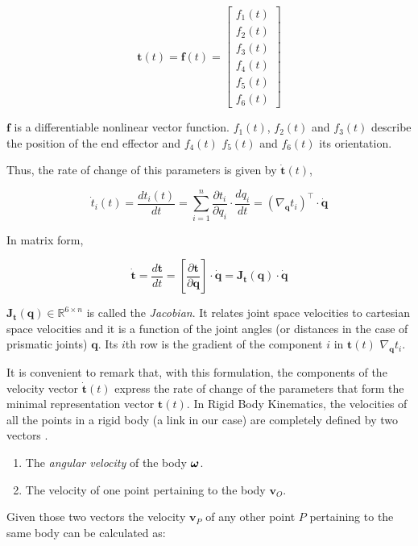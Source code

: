 $$\mathbf{t}(t) = \mathbf{f}(t) = \begin{bmatrix} f_{1}(t) \\ f_{2}(t) \\ f_{3}(t) \\ f_{4}(t) \\ f_{5}(t) \\ f_{6}(t) \end{bmatrix}
$$

$\mathbf{f}$ is a differentiable nonlinear vector function. $f_{1}(t)$, $f_{2}(t)$ and $f_{3}(t)$ describe the position of the end effector and $f_{4}(t)$ $f_{5}(t)$ and $f_{6}(t)$ its orientation.

Thus, the rate of change of this parameters is given by $\mathbf{\dot{t}}(t)$,

$$
\label{asdf}
{\dot{t}_i}(t) = \frac{d{{t}_i}(t)}{dt} = \sum_{i=1}^{n} \frac{\partial{{t}_i}}{\partial q_i} \cdot \frac{dq_i}{dt} = (\nabla_{\mathbf{q}}{t}_i)^{\intercal} \cdot \mathbf{\dot{q}}
$$

In matrix form,

$$
\mathbf{\dot{t}} = \frac{d\mathbf{{t}}}{dt} =
[
    \frac{\partial{\mathbf{t}}}{\partial \mathbf{q}}
]
\cdot \mathbf{\dot{q}} =
\mathbf{J}_{\mathbf{t}}(\mathbf{{q}}) \cdot \mathbf{\dot{q}}
$$

$\mathbf{J}_{\mathbf{t}}(\mathbf{{q}}) \in \mathbb{R}^{6 \times n}$ is called the \textit{Jacobian}. It relates joint space velocities to cartesian space velocities and it is a function of the joint angles (or distances in the case of prismatic joints) $\mathbf{{q}}$. Its $i$th row is the gradient of the component $i$ in $\mathbf{t}(t)$ $\nabla_{\mathbf{q}}{t}_i$.

It is convenient to remark that, with this formulation, the components of the velocity vector $\mathbf{\dot{t}}(t)$ express the rate of change of the parameters that form the minimal representation vector $\mathbf{t}(t)$. In Rigid Body Kinematics, the velocities of all the points in a rigid body (a link in our case) are completely defined by two vectors \cite{Ruigomez2010}.

\begin{enumerate}
    \item The \textit{angular velocity} of the body $\mbox{\boldmath$\omega$}$.
    \item The velocity of one point pertaining to the body $\mathbf{v}_{O}$.
\end{enumerate}

Given those two vectors the velocity $\mathbf{v}_{P}$ of any other point $P$ pertaining to the same body can be calculated as:

